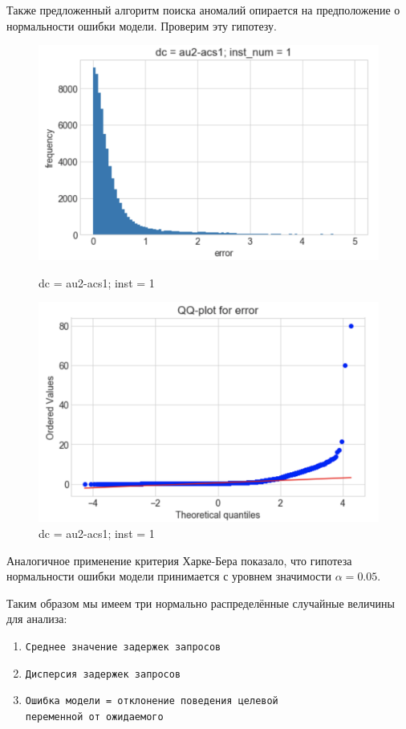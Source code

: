 \documentclass[14pt, a4paper]{extarticle}
\begin{document}
	Также предложенный  алгоритм поиска аномалий опирается на предположение о нормальности ошибки модели. Проверим эту гипотезу.
\begin{figure}[!htb]
		\includegraphics[width=\linewidth]{figures/error_hist.png}
		\caption{dc = au2-acs1; inst = 1}
		\endminipage\hfill
		\includegraphics[width=\linewidth]{figures/qq_error.png}
		\caption{dc = au2-acs1; inst = 1}
		\endminipage
	\end{figure}
		
	Аналогичное применение критерия Харке-Бера показало, что гипотеза нормальности ошибки модели принимается с уровнем значимости $\alpha = 0.05$.

	Таким образом мы имеем три нормально распределённые случайные величины для анализа:
	 \begin{enumerate}
	 	\item \texttt{Среднее значение задержек запросов}
	 	\item \texttt{Дисперсия задержек запросов}
	 	\item \texttt{Ошибка модели = отклонение поведения целевой}\\			\texttt{переменной от ожидаемого}
	 \end{enumerate}
	
\end{document}
